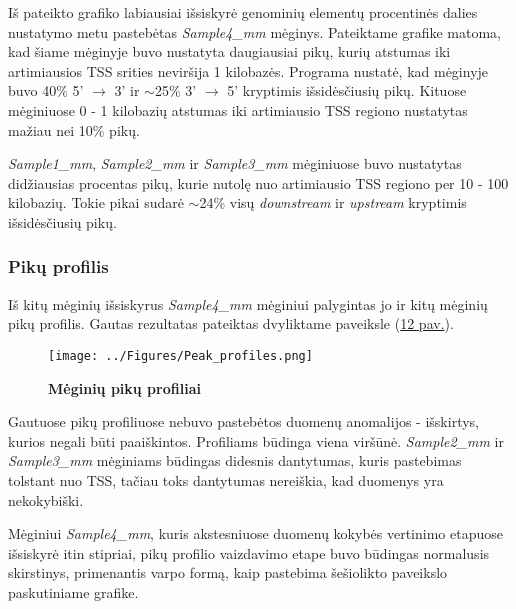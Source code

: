 \documentclass[12pt]{article}
\begin{document}
Iš pateikto grafiko labiausiai išsiskyrė genominių elementų procentinės
dalies nustatymo metu pastebėtas \emph{Sample4\_mm} mėginys. Pateiktame grafike
matoma, kad šiame mėginyje buvo nustatyta daugiausiai pikų, kurių atstumas iki
artimiausios TSS srities neviršija 1 kilobazės. Programa nustatė, kad
mėginyje buvo 40\% 5' \(\rightarrow\) 3' ir \(\sim\)25\% 3' \(\rightarrow\) 5'
kryptimis išsidėsčiusių pikų. Kituose mėginiuose 0 - 1 kilobazių atstumas iki
artimiausio TSS regiono nustatytas mažiau nei 10\% pikų.

\emph{Sample1\_mm}, \emph{Sample2\_mm} ir \emph{Sample3\_mm} mėginiuose
buvo nustatytas didžiausias procentas pikų, kurie nutolę nuo artimiausio
TSS regiono per 10 - 100 kilobazių. Tokie pikai sudarė \(\sim\)24\% visų
\emph{downstream} ir \emph{upstream} kryptimis išsidėsčiusių pikų.

\newpage

\subsubsection*{Pikų profilis}
Iš kitų mėginių išsiskyrus \emph{Sample4\_mm} mėginiui palygintas jo ir kitų
mėginių pikų profilis. Gautas rezultatas pateiktas dvyliktame paveiksle
(\hyperref[fig:image12]{12 pav.}).

\begin{figure}[ht]
    \begin{center}
        \captionsetup{justification=centering}
        \texttt{[image: ../Figures/Peak\_profiles.png]}
        \vspace{-1.5\baselineskip}
        \caption{\small\textbf{Mėginių pikų profiliai}}
    \label{fig:image12}
    \end{center}
\end{figure}

Gautuose pikų profiliuose nebuvo pastebėtos duomenų anomalijos - išskirtys,
kurios negali būti paaiškintos. Profiliams būdinga viena viršūnė.
\emph{Sample2\_mm} ir \emph{Sample3\_mm} mėginiams būdingas didesnis dantytumas,
kuris pastebimas tolstant nuo TSS, tačiau toks dantytumas nereiškia, kad
duomenys yra nekokybiški.

Mėginiui \emph{Sample4\_mm}, kuris akstesniuose
duomenų kokybės vertinimo etapuose išsiskyrė itin stipriai, pikų profilio
vaizdavimo etape buvo būdingas normalusis skirstinys, primenantis varpo formą,
kaip pastebima šešiolikto paveikslo paskutiniame grafike.

\newpage
\end{document}
